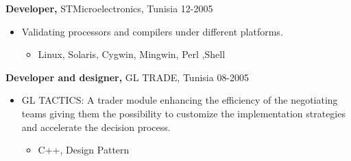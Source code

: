 \documentclass{res}
\begin{document}
\begin{resume}
{\bf Developer,} STMicroelectronics, Tunisia \hfill   12-2005
\begin{itemize} \itemsep -2pt  %
\item Validating processors and compilers under different platforms.
\begin{itemize} \itemsep -2pt  %
\item Linux, Solaris, Cygwin, Mingwin, Perl ,Shell
\end{itemize}
\end{itemize}

{\bf Developer and designer,} GL TRADE, Tunisia \hfill   08-2005
\begin{itemize} \itemsep -2pt  %
\item GL TACTICS: A trader module enhancing the efficiency of the negotiating teams giving them the possibility to customize the implementation strategies and accelerate the decision process.
\begin{itemize} \itemsep -2pt  %
\item C++, Design Pattern
\end{itemize}
\end{itemize}

\vspace{0.2in}

\end{resume}
\end{document}
